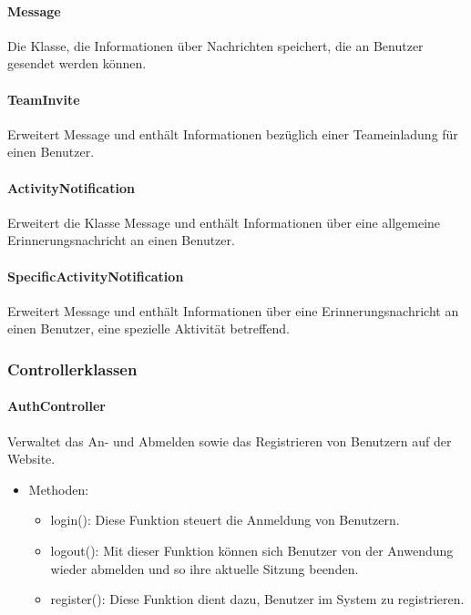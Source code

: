 	\paragraph{Message}Die Klasse, die Informationen \"uber Nachrichten speichert, die an Benutzer gesendet werden können.
	\paragraph{TeamInvite}Erweitert Message und enth\"alt Informationen bez\"uglich einer Teameinladung f\"ur einen Benutzer.
	\paragraph{ActivityNotification}Erweitert die Klasse Message und enth\"alt Informationen \"uber eine allgemeine Erinnerungsnachricht an einen Benutzer.
	\paragraph{SpecificActivityNotification}Erweitert Message und enth\"alt Informationen \"uber eine Erinnerungsnachricht an einen Benutzer, eine spezielle Aktivit\"at betreffend.

\subsubsection{Controllerklassen}
	\paragraph{AuthController}Verwaltet das An- und Abmelden sowie das Registrieren von Benutzern auf der Website.
		\begin{itemize}
			\item Methoden:
			\begin{itemize}
				\item login(): Diese Funktion steuert die Anmeldung von Benutzern.
				\item logout(): Mit dieser Funktion k\"onnen sich Benutzer von der Anwendung wieder abmelden und so ihre aktuelle Sitzung beenden.
				\item register(): Diese Funktion dient dazu, Benutzer im System zu registrieren.
			\end{itemize}
		\end{itemize}
